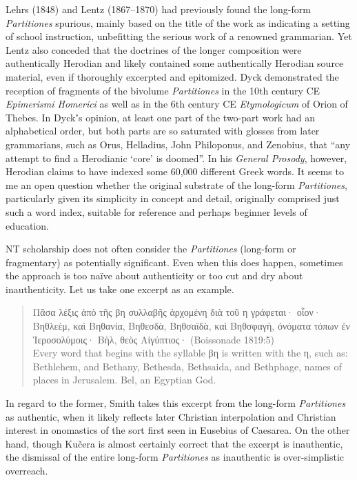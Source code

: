 Lehrs (1848) and Lentz (1867--1870) had previously found the long-form \textit{Partitiones} spurious, %
mainly based on the title of the work as indicating a setting of school instruction, %
unbefitting the serious work of a renowned grammarian. %
Yet Lentz also conceded that the doctrines of the longer composition were authentically Herodian %
and likely contained some authentically Herodian source material, even if thoroughly excerpted and epitomized. %
Dyck demonstrated the reception of fragments of the bivolume \textit{Partitiones} %
in the 10th century CE \textit{Epimerismi Homerici} %
as well as in the 6th century CE \textit{Etymologicum} of Orion of Thebes. %
In Dyckʼs opinion, at least one part of the two-part work %
had an alphabetical order, %
but both parts are so saturated with glosses from later grammarians, %
such as Orus, Helladius, John Philoponus, and Zenobius, %
that “any attempt to find a Herodianic ‘core’ is doomed”.
In his \textit{General Prosody}, however, %
Herodian claims to have indexed some 60,000 different Greek words. %
It seems to me an open question whether the original substrate of the long-form \textit{Partitiones}, %
particularly given its simplicity in concept and detail, %
originally comprised just such a word index, %
suitable for reference and perhaps beginner levels of education. %

NT scholarship does not often consider the \textit{Partitiones} (long-form or fragmentary) as potentially significant. %
Even when this does happen, %
sometimes the approach is too naïve about authenticity or too cut and dry about inauthenticity. %
Let us take one excerpt as an example. %

\vspace*{3mm} 
 \begin{quote}Πᾶσα λέξις ἀπὸ τῆς βη συλλαβῆς ἀρχομένη διὰ τοῦ η γράφεται· %
 οἷον· Βηθλεὲμ, καὶ Βηθανία, Βηθεσδὰ, Βηθσαϊδὰ, %
 καὶ Βηθσφαγὴ, ὀνόματα τόπων ἐν Ἱεροσολύμοις· Βὴλ, θεὸς Αἰγύπτιος· (Boissonade 1819:5)\\[1mm] %
 Every word that begins with the syllable βη is written with the η, %
 such as: Bethlehem, and Bethany, Bethesda, Bethsaida, %
 and Bethphage, names of places in Jerusalem. Bel, an Egyptian God. %
 \end{quote} %
 \vspace*{3mm}
 
\noindent{}In regard to the former, Smith takes this excerpt from the long-form \textit{Partitiones} as authentic, %
when it likely reflects later Christian interpolation %
and Christian interest in onomastics of the sort first seen in Eusebius of Caesarea. %
On the other hand, though Kučera is almost certainly correct that the excerpt is inauthentic, %
the dismissal of the entire long-form \textit{Partitiones} as inauthentic is over-simplistic overreach.

